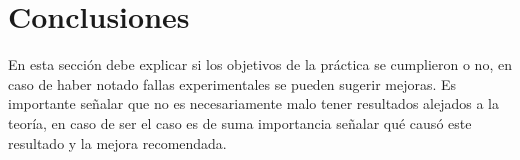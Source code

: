 \section*{Conclusiones}
\label{sec:Conclusión}

En esta sección debe explicar si los objetivos de la práctica se cumplieron o no, en caso de haber notado fallas experimentales se pueden sugerir mejoras. Es importante señalar que no es necesariamente malo tener resultados alejados a la teoría, en caso de ser el caso es de suma importancia señalar qué causó este resultado y la mejora recomendada.